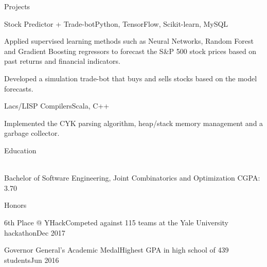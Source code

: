\documentclass{resume} %
\begin{document}

\begin{rSection}{Projects}

\begin{projSec}{Stock Predictor + Trade-bot}{}{Python, TensorFlow, Scikit-learn, MySQL \href{https://github.com/UWCESEDUO/stock-prediction}{\space\faGithub}}
\item Applied supervised learning methods such as Neural Networks, Random Forest and Gradient Boosting regressors to forecast the S\&P 500 stock prices based on past returns and financial indicators.
\item Developed a simulation trade-bot that buys and sells stocks based on the model forecasts.
\end{projSec}

\begin{projSec}{Lacs/LISP Compilers}{}{Scala, C++ \href{https://github.com/jsun98/SchemePlusPlus}{\space\faGithub}}
\item Implemented the CYK parsing algorithm, heap/stack memory management and a garbage collector.
\end{projSec}

\end{rSection}



\begin{rSection}{Education}

\vspace{-1em}
\\ Bachelor of Software Engineering, Joint Combinatorics and Optimization \hfill {CGPA: 3.70 }

\end{rSection}


\begin{rSection}{Honors}

\begin{honorSec}{6th Place @ YHack}{Competed against 115 teams at the Yale University hackathon}{Dec 2017}\end{honorSec}
\begin{honorSec}{Governor General's Academic Medal}{Highest GPA in high school of 439 students}{Jun 2016}\end{honorSec}
\vspace{1em} 

\end{rSection}
\end{document}
